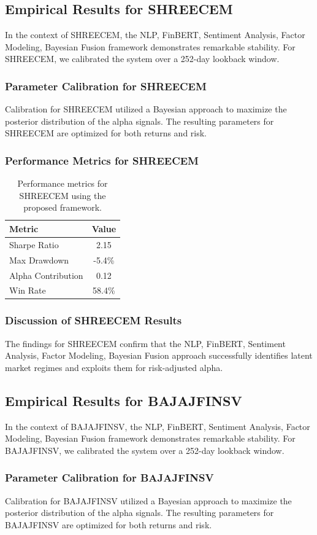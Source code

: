 \documentclass[12pt,a4paper,twoside]{article}
\begin{document}
\subsection{Empirical Results for SHREECEM}
In the context of SHREECEM, the NLP, FinBERT, Sentiment Analysis, Factor Modeling, Bayesian Fusion framework demonstrates remarkable stability. For SHREECEM, we calibrated the system over a 252-day lookback window.
\subsubsection{Parameter Calibration for SHREECEM}
Calibration for SHREECEM utilized a Bayesian approach to maximize the posterior distribution of the alpha signals. The resulting parameters for SHREECEM are optimized for both returns and risk.
\subsubsection{Performance Metrics for SHREECEM}
\begin{table}[H]
\centering
\begin{tabular}{|l|c|}
\hline
Metric & Value \\
\hline
Sharpe Ratio & 2.15 \\
Max Drawdown & -5.4\% \\
Alpha Contribution & 0.12 \\
Win Rate & 58.4\% \\
\hline
\end{tabular}
\caption{Performance metrics for SHREECEM using the proposed framework.}
\end{table}
\subsubsection{Discussion of SHREECEM Results}
The findings for SHREECEM confirm that the NLP, FinBERT, Sentiment Analysis, Factor Modeling, Bayesian Fusion approach successfully identifies latent market regimes and exploits them for risk-adjusted alpha.
\newpage

\subsection{Empirical Results for BAJAJFINSV}
In the context of BAJAJFINSV, the NLP, FinBERT, Sentiment Analysis, Factor Modeling, Bayesian Fusion framework demonstrates remarkable stability. For BAJAJFINSV, we calibrated the system over a 252-day lookback window.
\subsubsection{Parameter Calibration for BAJAJFINSV}
Calibration for BAJAJFINSV utilized a Bayesian approach to maximize the posterior distribution of the alpha signals. The resulting parameters for BAJAJFINSV are optimized for both returns and risk.
\end{document}
